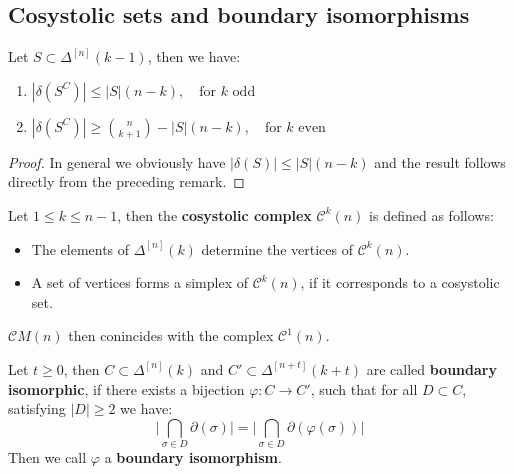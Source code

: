 \subsection{Cosystolic sets and boundary isomorphisms}

\begin{lem}
Let \(S\subset\Delta^{[n]}(k-1)\), then we have:
\begin{enumerate}
\item \(|\delta(S^C)|\leq |S|(n-k),\quad\text{for }k\text{ odd}\)
\item \(|\delta(S^C)|\geq\binom{n}{k+1}-|S|(n-k),\quad\text{for }k\text{ even}\)
\end{enumerate}
\begin{proof}
In general we obviously have \(|\delta(S)|\leq |S|(n-k)\) and the result follows directly from the preceding remark.
\end{proof}
\end{lem}

\begin{defi}\label{definition2}
Let \(1\leq k\leq n-1\), then the \textbf{cosystolic complex} \(\mathcal{C}^k(n)\) is defined as follows:
\begin{itemize}
\item The elements of \(\Delta^{[n]}(k)\) determine the vertices of \(\mathcal{C}^k(n)\).
\item A set of vertices forms a simplex of \(\mathcal{C}^k(n)\), if it corresponds to a cosystolic set.
\end{itemize}
\(\mathcal{C}M(n)\) then conincides with the complex \(\mathcal{C}^1(n)\).
\end{defi}

\begin{defi}
Let \(t\geq 0\), then \(C\subset\Delta^{[n]}(k)\) and \(C'\subset\Delta^{[n+t]}(k+t)\) are called \textbf{boundary isomorphic}, if there exists a bijection \(\varphi:C\rightarrow C'\), such that for all \(D\subset C\), satisfying \(|D|\geq 2\) we have:
\[
\bigg\vert\bigcap\limits_{\sigma\in D}\partial(\sigma)\bigg\vert=\bigg\vert\bigcap\limits_{\sigma\in D}\partial(\varphi(\sigma))\bigg\vert
\]
Then we call \(\varphi\) a \textbf{boundary isomorphism}.
\end{defi}

